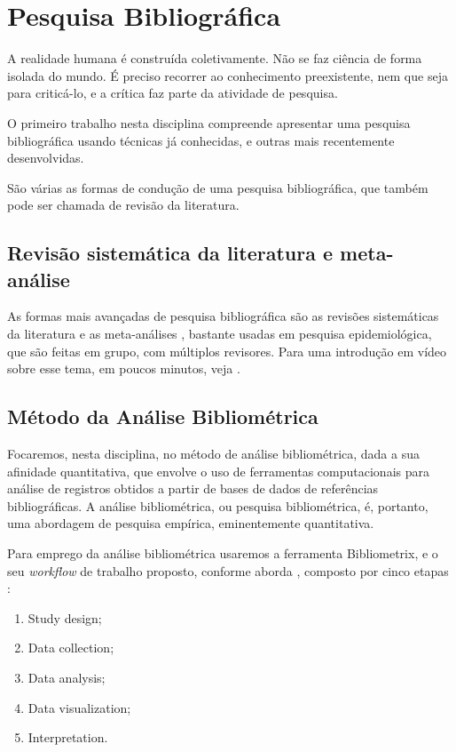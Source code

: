\chapter{Pesquisa Bibliográfica}

A realidade humana é construída coletivamente. Não se faz ciência de forma isolada do mundo. É preciso recorrer ao conhecimento preexistente, nem que seja para criticá-lo, e a crítica faz parte da atividade de pesquisa.

O primeiro trabalho nesta disciplina compreende apresentar uma pesquisa bibliográfica usando técnicas já conhecidas, e outras mais recentemente desenvolvidas.

São várias as formas de condução de uma pesquisa bibliográfica, que também pode ser chamada de revisão da literatura.

\section{Revisão sistemática da literatura e meta-análise}

As formas mais avançadas de pesquisa bibliográfica  são as revisões sistemáticas da literatura e as meta-análises \citep{littell_systematic_2008,dresch_systematic_2015,higgins_cochrane_2011}, bastante usadas em pesquisa epidemiológica, que são feitas em grupo, com múltiplos revisores. Para uma introdução em vídeo sobre esse tema, em poucos minutos, veja \cite{testoni_revisao_2015}.

\section{Método da Análise Bibliométrica\label{metodo:analise:bibliografica}}

Focaremos, nesta disciplina, no método de análise bibliométrica, dada a sua afinidade quantitativa, que envolve o uso de ferramentas computacionais para análise de registros obtidos a partir de bases de dados de referências bibliográficas. A análise bibliométrica, ou pesquisa bibliométrica, é, portanto, uma abordagem de pesquisa empírica, eminentemente quantitativa.

Para emprego da análise bibliométrica usaremos a ferramenta Bibliometrix, e o seu \textit{workflow} de trabalho proposto, conforme aborda \cite{aria_bibliometrix_2017}, composto por cinco etapas \cite[p. 950]{aria_bibliometrix_2017}:
\begin{enumerate}
\item Study design;
\item Data collection;
\item Data analysis;
\item Data visualization;
\item Interpretation.
\end{enumerate}

